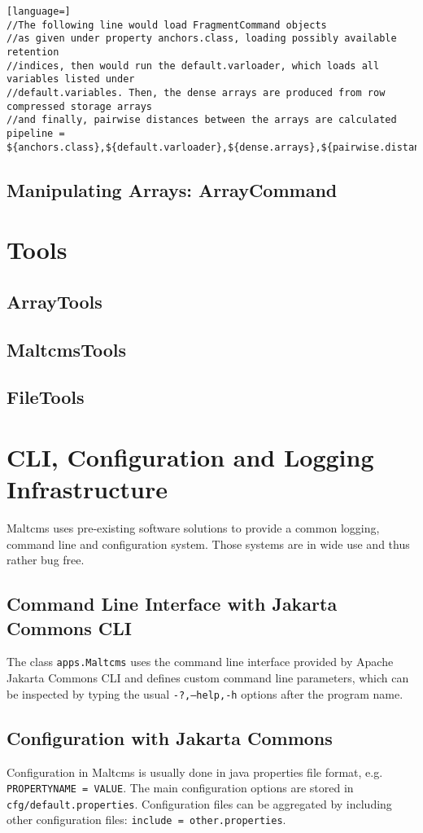 \documentclass[a4paper,10pt]{article}
\begin{document}
\begin{lstlisting}[language=]
//The following line would load FragmentCommand objects 
//as given under property anchors.class, loading possibly available retention 
//indices, then would run the default.varloader, which loads all variables listed under
//default.variables. Then, the dense arrays are produced from row compressed storage arrays
//and finally, pairwise distances between the arrays are calculated
pipeline = ${anchors.class},${default.varloader},${dense.arrays},${pairwise.distances}
\end{lstlisting}

\subsection{Manipulating Arrays: ArrayCommand}
\section{Tools}
\subsection{ArrayTools}
\subsection{MaltcmsTools}
\subsection{FileTools}
\section{CLI, Configuration and Logging Infrastructure}
Maltcms uses pre-existing software solutions to provide a common logging, command line and configuration system.
Those systems are in wide use and thus rather bug free.
\subsection{Command Line Interface with Jakarta Commons CLI}
The class \texttt{apps.Maltcms} uses the command line interface provided by Apache Jakarta Commons CLI and defines 
custom command line parameters, which can be inspected by typing the usual \texttt{-?,--help,-h} options after the program name.
\subsection{Configuration with Jakarta Commons}
Configuration in Maltcms is usually done in java properties file format, e.g. \texttt{PROPERTYNAME = VALUE}.
The main configuration options are stored in \texttt{cfg/default.properties}. Configuration files can be aggregated 
by including other configuration files: \texttt{include = other.properties}.
\end{document}
